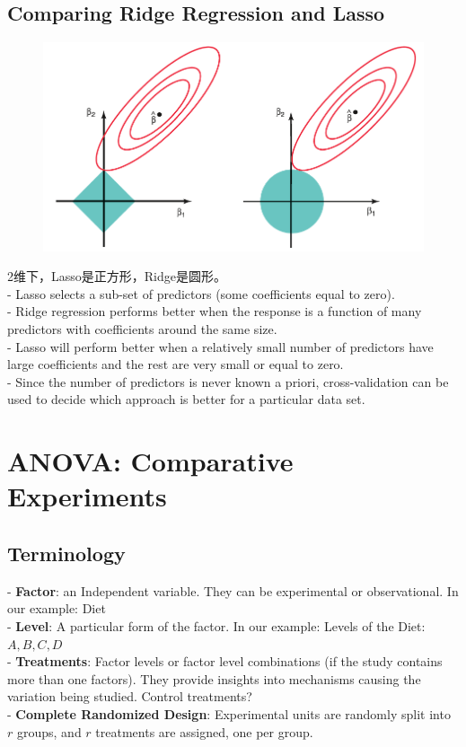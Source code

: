 \documentclass[11pt,a4paper]{article}
\begin{document}
\subsection{Comparing Ridge Regression and Lasso}
\begin{center}\begin{figure}[htbp]
    \centering
    \includegraphics[scale=0.3]{compare.png}
    \caption{}
    \label{}
\end{figure}\end{center}
2维下，Lasso是正方形，Ridge是圆形。\\
- Lasso selects a sub-set of predictors (some coefficients equal to zero).\\
- Ridge regression performs better when the response is a function of many predictors with coefficients around the same size.\\
- Lasso will perform better when a relatively small number of predictors have large coefficients and the rest are very small or equal to zero.\\
- Since the number of predictors is never known a priori, cross-validation can be used to decide which approach is better for a particular data set.

\section{ANOVA: Comparative Experiments}
\subsection{Terminology}
- \textbf{Factor}: an Independent variable. They can be experimental or observational. In our example: Diet\\
- \textbf{Level}: A particular form of the factor. In our example: Levels of the Diet: $A, B, C, D$\\
- \textbf{Treatments}: Factor levels or factor level combinations (if the study contains more than one factors). They provide insights into mechanisms causing the variation being studied. Control treatments?\\
- \textbf{Complete Randomized Design}: Experimental units are randomly split into $r$ groups, and $r$ treatments are assigned, one per group.
\end{document}

